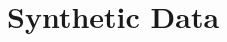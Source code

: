 \documentclass[11pt]{article}
\theoremstyle{definition}
\theoremstyle{definition}
\def\bSigma{{\bf \Sigma}}
\begin{document}

%
 













\section{Synthetic Data}
\label{simulation}

\end{document}
